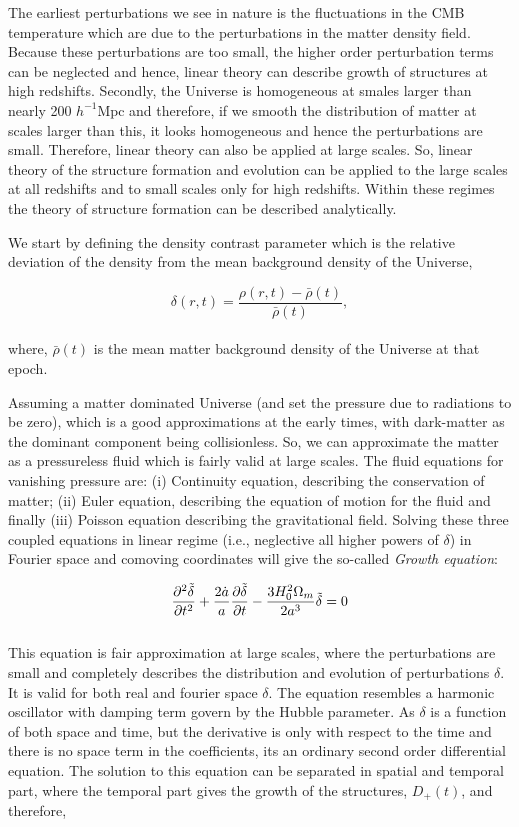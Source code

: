 The earliest perturbations we see in nature is the fluctuations in the
CMB temperature which are due to the perturbations in the matter density
field. Because these perturbations are too small, the higher order perturbation
terms can be neglected and hence, linear theory can describe growth of structures
at high redshifts. Secondly, the Universe is homogeneous at smales larger than
nearly 200 $h^{-1} \mathrm{Mpc}$ and therefore, if we smooth the distribution
of matter at scales larger than this, it looks homogeneous and hence the perturbations
are small. Therefore, linear theory can also be applied at large scales. 
So, linear theory of the structure formation and evolution can be applied
to the large scales at all redshifts and to small scales only for high 
redshifts. Within these regimes the theory of structure formation can be
described analytically.

We start by defining the density contrast parameter which is the relative 
deviation of the density from the mean background density of the Universe,

\begin{equation}
	\delta(r,t) = \dfrac{\rho(r,t) - \bar{\rho}(t)}{\bar{\rho}(t)},
\end{equation}
\\
where, $\bar{\rho}(t)$ is the mean matter background density 
of the Universe at that epoch. 

Assuming a matter dominated Universe (and set the pressure due to radiations
to be zero), which is a good approximations at the
early times, with dark-matter as the dominant component being collisionless. 
So, we can approximate the matter as a pressureless fluid which is fairly 
valid at large scales. The fluid equations for vanishing pressure are: 
(i) Continuity equation, describing the conservation of matter; (ii) Euler
equation, describing the equation of motion for the fluid and finally (iii) 
Poisson equation describing the gravitational field. Solving these three coupled
equations in linear regime (i.e., neglective all higher powers of $\delta$) in 
Fourier space and comoving coordinates will give
the so-called {\it Growth equation}:

\begin{equation}
\centering
\dfrac{\partial^2 \tilde{\delta}}{\partial t^2} + \dfrac{2\dot{a}}{a} 
		\dfrac{\partial \tilde{\delta}}{\partial t}
		- \dfrac{3H_0^2 \Omega_m}{2a^3} \tilde{\delta} = 0
		\label{eqn:growth}
\end{equation}
\\
This equation is fair approximation at large scales, where the perturbations
are small and completely describes the distribution and evolution of perturbations $\delta$. 
It is valid for both real and fourier space $\delta$.
The equation resembles a harmonic oscillator with damping
term govern by the Hubble parameter. As $\delta$ is a function of both space
and time, but the derivative is only with respect to the time and there is 
no space term in the coefficients, its an ordinary second order differential equation.
The solution to this equation can be 
separated in spatial and temporal part, where the temporal part gives the 
growth of the structures, $D_+(t)$, and therefore,


